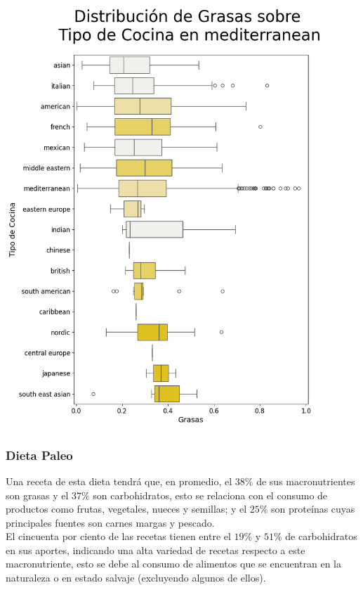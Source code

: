 \documentclass[12pt,a4paper]{article}
\begin{document}
            \begin{center}
                \includegraphics[width=0.90\textwidth]{Resources/2_03_plot_03_3.png}
            \end{center}

        \subsubsection{Dieta Paleo}

            Una receta de esta dieta tendrá que, en promedio, el $38\%$ de sus 
            macronutrientes son grasas y el $37\%$ son carbohidratos, esto se 
            relaciona con el consumo de productos como frutas, vegetales, nueces 
            y semillas; y el $25\%$ son proteínas cuyas principales fuentes son 
            carnes margas y pescado.\\

            El cincuenta por ciento de las recetas tienen entre el $19\%$ y $51\%$ 
            de carbohidratos en sus aportes, indicando una alta variedad de recetas 
            respecto a este macronutriente, esto se debe al consumo de alimentos que 
            se encuentran en la naturaleza o en estado salvaje (excluyendo algunos 
            de ellos).\\
\end{document}
